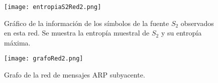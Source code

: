 \begin{figure}[H]
\centering
\texttt{[image: entropiaS2Red2.png]}
\caption{Gráfico de la información de los símbolos de la fuente $S_2$ observados en esta red. Se muestra la entropía muestral de $S_2$ y su entropía máxima.}
\label{entropias2_2}
\end{figure}

\begin{figure}[H]
\centering
\texttt{[image: grafoRed2.png]}
\caption{Grafo de la red de mensajes ARP subyacente.}
\label{grafo2}
\end{figure}
